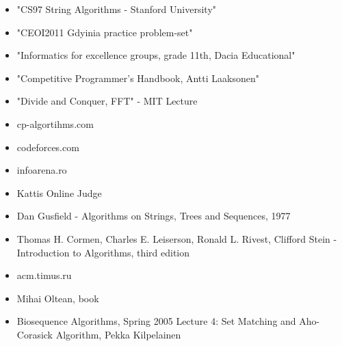\documentclass[letterpaper]{article}
\begin{document}
\begin{itemize}
    \item "CS97 String Algorithms - Stanford University"
    \item "CEOI2011 Gdyinia practice problem-set"
    \item "Informatics for excellence groups, grade 11th, Dacia Educational"
    \item "Competitive Programmer's Handbook, Antti Laaksonen"
    \item "Divide and Conquer, FFT" - MIT Lecture
    \item cp-algortihms.com
    \item codeforces.com
    \item infoarena.ro
    \item Kattis Online Judge
    \item Dan Gusfield - Algorithms on Strings, Trees and Sequences, 1977
    \item Thomas H. Cormen, Charles E. Leiserson, Ronald L. Rivest, Clifford Stein - Introduction to Algorithms, third edition
    \item acm.timus.ru
    \item Mihai Oltean, book
    \item Biosequence Algorithms, Spring 2005 Lecture 4: Set Matching and Aho-Corasick Algorithm, Pekka Kilpelainen  
    
\end{itemize}
\end{document}
